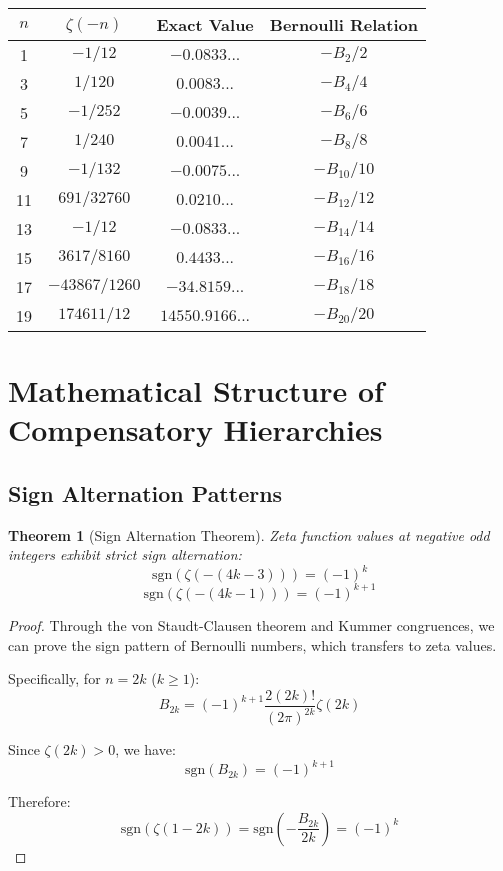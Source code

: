 \documentclass[12pt]{article}
\newtheorem{theorem}{Theorem}[section]
\begin{document}
\begin{center}
\begin{tabular}{|c|c|c|c|}
\hline
$n$ & $\zeta(-n)$ & Exact Value & Bernoulli Relation \\
\hline
1 & $-1/12$ & $-0.0833...$ & $-B_2/2$ \\
3 & $1/120$ & $0.0083...$ & $-B_4/4$ \\
5 & $-1/252$ & $-0.0039...$ & $-B_6/6$ \\
7 & $1/240$ & $0.0041...$ & $-B_8/8$ \\
9 & $-1/132$ & $-0.0075...$ & $-B_{10}/10$ \\
11 & $691/32760$ & $0.0210...$ & $-B_{12}/12$ \\
13 & $-1/12$ & $-0.0833...$ & $-B_{14}/14$ \\
15 & $3617/8160$ & $0.4433...$ & $-B_{16}/16$ \\
17 & $-43867/1260$ & $-34.8159...$ & $-B_{18}/18$ \\
19 & $174611/12$ & $14550.9166...$ & $-B_{20}/20$ \\
\hline
\end{tabular}
\end{center}

\section{Mathematical Structure of Compensatory Hierarchies}

\subsection{Sign Alternation Patterns}

\begin{theorem}[Sign Alternation Theorem]
Zeta function values at negative odd integers exhibit strict sign alternation:
$$\text{sgn}(\zeta(-(4k-3))) = (-1)^k$$
$$\text{sgn}(\zeta(-(4k-1))) = (-1)^{k+1}$$
\end{theorem}

\begin{proof}
Through the von Staudt-Clausen theorem and Kummer congruences, we can prove the sign pattern of Bernoulli numbers, which transfers to zeta values.

Specifically, for $n = 2k$ ($k \geq 1$):
$$B_{2k} = (-1)^{k+1} \frac{2(2k)!}{(2\pi)^{2k}} \zeta(2k)$$

Since $\zeta(2k) > 0$, we have:
$$\text{sgn}(B_{2k}) = (-1)^{k+1}$$

Therefore:
$$\text{sgn}(\zeta(1-2k)) = \text{sgn}\left(-\frac{B_{2k}}{2k}\right) = (-1)^k$$
\end{proof}
\end{document}
